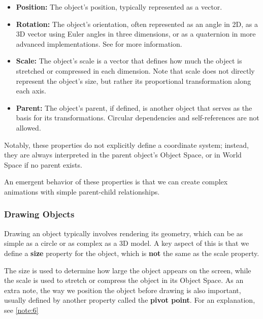 \begin{itemize}
    \item \textbf{Position:} The object's position, typically represented as a vector.
    \item \textbf{Rotation:} The object's orientation, often represented as an angle in 2D, as a 3D vector using Euler angles in three dimensions, or as a quaternion in more advanced implementations. See \cite[Section~10.6]{learn-opengl} for more information.
    \item \textbf{Scale:} The object's scale is a vector that defines how much the object is stretched or compressed in each dimension. Note that scale does not directly represent the object's size, but rather its proportional transformation along each axis.
    \item \textbf{Parent:} The object's parent, if defined, is another object that serves as the basis for its transformations. Circular dependencies and self-references are not allowed.
\end{itemize}

Notably, these properties do not explicitly define a coordinate system; instead, they are always interpreted in the parent object's Object Space, or in World Space if no parent exists.


An emergent behavior of these properties is that we can create complex animations with simple parent-child relationships.

\vspace{0.5cm}

\subsubsection{Drawing Objects}

Drawing an object typically involves rendering its geometry, which can be as simple as a circle or as complex as a 3D model. A key aspect of this is that we define a \textbf{size} property for the object, which is \textbf{not} the same as the scale property. 

The size is used to determine how large the object appears on the screen, while the scale is used to stretch or compress the object in its Object Space. As an extra note, the way we position the object before drawing is also important, usually defined by another property called the \textbf{pivot point}. For an explanation, see \ref{note:6}

